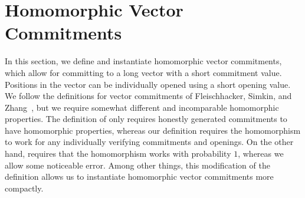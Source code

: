 \section{Homomorphic Vector Commitments}\label{sec:veccom}

In this section, we define and instantiate homomorphic vector commitments, which allow for committing to a long vector with a short commitment value.
Positions in the vector can be individually opened using a short opening value.
We follow the definitions for vector commitments of Fleischhacker, Simkin, and Zhang~\cite{CCS:FleSimZha22}, but we require somewhat different and incomparable homomorphic properties. 
The definition of \cite{CCS:FleSimZha22} only requires honestly generated commitments to have homomorphic properties, whereas our definition requires the homomorphism to work for any individually verifying commitments and openings.
On the other hand, \cite{CCS:FleSimZha22} requires that the homomorphism works with probability $1$, whereas we allow some noticeable error.
Among other things, this modification of the definition allows us to instantiate homomorphic vector commitments more compactly.



